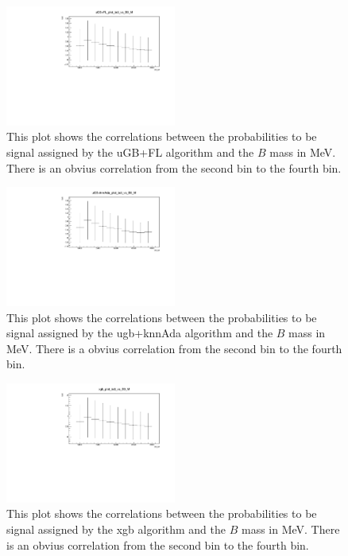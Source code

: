 \documentclass[english]{uzhpub}
\begin{document}
 \begin{figure}[H]
  \centering
  \includegraphics[width=0.5\textwidth]{plots/uGB+FL_plot_bdt_vs_B0_M}
  \caption{This plot shows the correlations between the probabilities to be signal assigned by the uGB+FL algorithm and the $B$ mass in MeV. There is an obvius correlation from the second bin to the fourth bin.}
  \label{fig:uGB+FLB0M}
 \end{figure}

 \begin{figure}[H]
  \centering
  \includegraphics[width=0.5\textwidth]{plots/uGB+knnAda_plot_bdt_vs_B0_M}
  \caption{This plot shows the correlations between the probabilities to be signal assigned by the ugb+knnAda algorithm and the $B$ mass in MeV. There is a obvius correlation from the second bin to the fourth bin.}
  \label{fig:uGB+knnAdaB0M}
 \end{figure}

 \begin{figure}[H]
  \centering
  \includegraphics[width=0.5\textwidth]{plots/xgb_plot_bdt_vs_B0_M}
  \caption{This plot shows the correlations between the probabilities to be signal assigned by the xgb algorithm and the $B$ mass in MeV. There is an obvius correlation from the second bin to the fourth bin.}
  \label{fig:xgbB0M}
 \end{figure}
\end{document}
